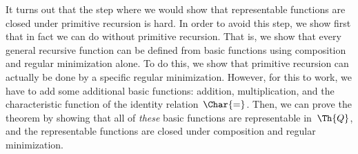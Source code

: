 \documentclass[../../../include/open-logic-section]{subfiles}
\begin{document}
It turns out that the step where we would show that representable
functions are closed under primitive recursion is hard. In order to
avoid this step, we show first that in fact we can do without
primitive recursion. That is, we show that every general recursive
function can be defined from basic functions using composition and
regular minimization alone.  To do this, we show that primitive
recursion can actually be done by a specific regular minimization.
However, for this to work, we have to add some additional basic
functions: addition, multiplication, and the characteristic function
of the identity relation~$\Char{=}$.  Then, we can prove the theorem
by showing that all of \emph{these} basic functions are representable
in~$\Th{Q}$, and the representable functions are closed under
composition and regular minimization.
\end{document}
